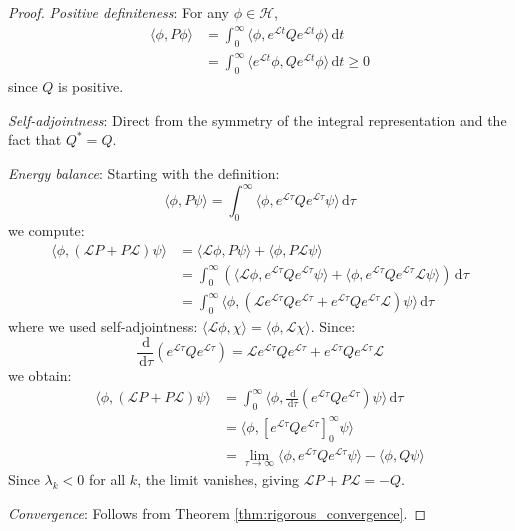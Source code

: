 \documentclass[10pt,a4paper]{amsart}
\def\H{\mathcal{H}}
\newcommand{\dd}{\,\mathrm{d}}
\newcommand{\inner}[2]{\langle #1, #2 \rangle}
\begin{document}
\begin{proof}
\textit{Positive definiteness}: For any $\phi \in \H$,
\begin{align}
\inner{\phi}{P\phi} &= \int_0^{\infty} \inner{\phi}{e^{\mathcal{L}t} Q e^{\mathcal{L}t} \phi} \dd t\\
&= \int_0^{\infty} \inner{e^{\mathcal{L}t}\phi}{Q e^{\mathcal{L}t}\phi} \dd t \geq 0
\end{align}
since $Q$ is positive.

\textit{Self-adjointness}: Direct from the symmetry of the integral representation and the fact that $Q^* = Q$.

\textit{Energy balance}: Starting with the definition:
\begin{equation}
\inner{\phi}{P\psi} = \int_0^{\infty} \inner{\phi}{e^{\mathcal{L}\tau} Q e^{\mathcal{L}\tau} \psi} \dd\tau
\end{equation}
we compute:
\begin{align}
\inner{\phi}{(\mathcal{L}P + P\mathcal{L})\psi} &= \inner{\mathcal{L}\phi}{P\psi} + \inner{\phi}{P\mathcal{L}\psi}\\
&= \int_0^{\infty} \left(\inner{\mathcal{L}\phi}{e^{\mathcal{L}\tau} Q e^{\mathcal{L}\tau} \psi} + \inner{\phi}{e^{\mathcal{L}\tau} Q e^{\mathcal{L}\tau} \mathcal{L}\psi}\right) \dd\tau\\
&= \int_0^{\infty} \inner{\phi}{(\mathcal{L}e^{\mathcal{L}\tau} Q e^{\mathcal{L}\tau} + e^{\mathcal{L}\tau} Q e^{\mathcal{L}\tau}\mathcal{L})\psi} \dd\tau
\end{align}
where we used self-adjointness: $\inner{\mathcal{L}\phi}{\chi} = \inner{\phi}{\mathcal{L}\chi}$. Since:
\begin{equation}
\frac{\dd}{\dd\tau}(e^{\mathcal{L}\tau} Q e^{\mathcal{L}\tau}) = \mathcal{L}e^{\mathcal{L}\tau} Q e^{\mathcal{L}\tau} + e^{\mathcal{L}\tau} Q e^{\mathcal{L}\tau}\mathcal{L}
\end{equation}
we obtain:
\begin{align}
\inner{\phi}{(\mathcal{L}P + P\mathcal{L})\psi} &= \int_0^{\infty} \inner{\phi}{\frac{\dd}{\dd\tau}(e^{\mathcal{L}\tau} Q e^{\mathcal{L}\tau})\psi} \dd\tau\\
&= \inner{\phi}{\left[e^{\mathcal{L}\tau} Q e^{\mathcal{L}\tau}\right]_0^{\infty}\psi}\\
&= \lim_{\tau \to \infty} \inner{\phi}{e^{\mathcal{L}\tau} Q e^{\mathcal{L}\tau}\psi} - \inner{\phi}{Q\psi}
\end{align}
Since $\lambda_k < 0$ for all $k$, the limit vanishes, giving $\mathcal{L}P + P\mathcal{L} = -Q$.

\textit{Convergence}: Follows from Theorem \ref{thm:rigorous_convergence}.
\end{proof}
\end{document}
